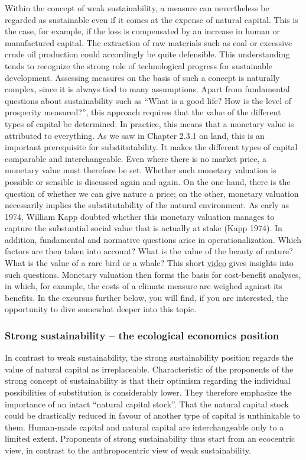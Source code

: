 \documentclass[
  british,
  a4paper,
  DIV=11,
  numbers=noendperiod,
  oneside,
  openany]{scrreprt}
\begin{document}
Within the concept of weak sustainability, a measure can nevertheless be
regarded as sustainable even if it comes at the expense of natural
capital. This is the case, for example, if the loss is compensated by an
increase in human or manufactured capital. The extraction of raw
materials such as coal or excessive crude oil production could
accordingly be quite defensible. This understanding tends to recognize
the strong role of technological progress for sustainable development.
Assessing measures on the basis of such a concept is naturally complex,
since it is always tied to many assumptions. Apart from fundamental
questions about sustainability such as ``What is a good life? How is the
level of prosperity measured?'', this approach requires that the value
of the different types of capital be determined. In practice, this means
that a monetary value is attributed to everything. As we saw in Chapter
2.3.1 on land, this is an important prerequisite for substitutability.
It makes the different types of capital comparable and interchangeable.
Even where there is no market price, a monetary value must therefore be
set. Whether such monetary valuation is possible or sensible is
discussed again and again. On the one hand, there is the question of
whether we can give nature a price; on the other, monetary valuation
necessarily implies the substitutability of the natural environment. As
early as 1974, William Kapp doubted whether this monetary valuation
manages to capture the substantial social value that is actually at
stake (Kapp 1974). In addition, fundamental and normative questions
arise in operationalization. Which factors are then taken into account?
What is the value of the beauty of nature? What is the value of a rare
bird or a whale? This short
\href{https://www.youtube.com/watch?v=MSxIBYOMQOU}{video} gives insights
into such questions. Monetary valuation then forms the basis for
cost-benefit analyses, in which, for example, the costs of a climate
measure are weighed against its benefits. In the excursus further below,
you will find, if you are interested, the opportunity to dive somewhat
deeper into this topic.

\subsubsection{Strong sustainability -- the ecological economics
position}\label{strong-sustainability-the-ecological-economics-position}

In contrast to weak sustainability, the strong sustainability position
regards the value of natural capital as irreplaceable. Characteristic of
the proponents of the strong concept of sustainability is that their
optimism regarding the individual possibilities of substitution is
considerably lower. They therefore emphasize the importance of an intact
``natural capital stock''. That the natural capital stock could be
drastically reduced in favour of another type of capital is unthinkable
to them. Human-made capital and natural capital are interchangeable only
to a limited extent. Proponents of strong sustainability thus start from
an ecocentric view, in contrast to the anthropocentric view of weak
sustainability.
\end{document}
